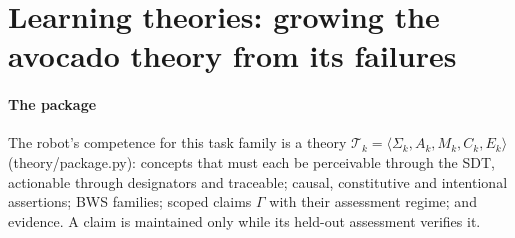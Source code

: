 \documentclass[10.5pt,a4paper]{article}
\begin{document}
\section{Learning theories: growing the avocado theory from its failures}\label{sec:learning}
\paragraph{The package} The robot's competence for this task family is a theory
$\mathcal{T}_k=\langle\Sigma_k,A_k,M_k,C_k,E_k\rangle$ (theory/package.py): concepts that must each be perceivable
through the SDT, actionable through designators and traceable; causal, constitutive and intentional assertions; BWS
families; scoped claims $\Gamma$ with their assessment regime; and evidence. A claim is maintained only while its
held-out assessment verifies it.
\end{document}
